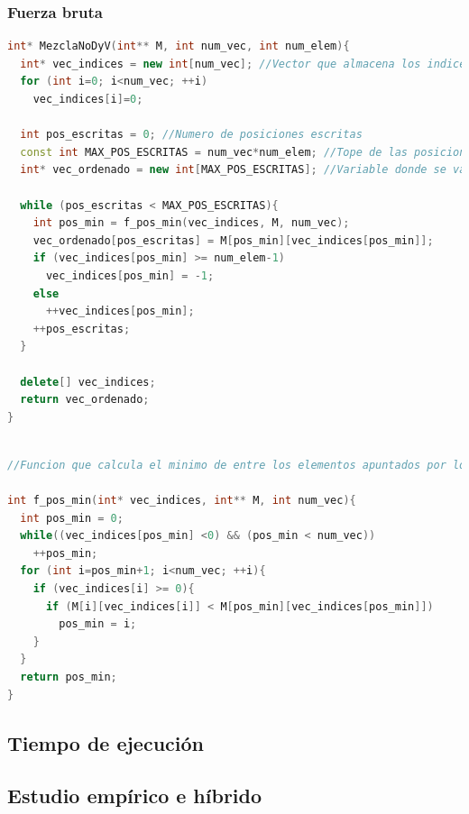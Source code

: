 \subsubsection{Fuerza bruta}

\begin{lstlisting}[language=c++]
int* MezclaNoDyV(int** M, int num_vec, int num_elem){
  int* vec_indices = new int[num_vec]; //Vector que almacena los indices
  for (int i=0; i<num_vec; ++i)
    vec_indices[i]=0;

  int pos_escritas = 0; //Numero de posiciones escritas
  const int MAX_POS_ESCRITAS = num_vec*num_elem; //Tope de las posiciones que se pueden escribir (n*k)
  int* vec_ordenado = new int[MAX_POS_ESCRITAS]; //Variable donde se va almacenando el vector resultante ordenado.

  while (pos_escritas < MAX_POS_ESCRITAS){
    int pos_min = f_pos_min(vec_indices, M, num_vec);
    vec_ordenado[pos_escritas] = M[pos_min][vec_indices[pos_min]];
    if (vec_indices[pos_min] >= num_elem-1)
      vec_indices[pos_min] = -1;
    else
      ++vec_indices[pos_min];
    ++pos_escritas;
  }

  delete[] vec_indices;
  return vec_ordenado;
}
\end{lstlisting}

\begin{lstlisting}[language=c++]

//Funcion que calcula el minimo de entre los elementos apuntados por los indices

int f_pos_min(int* vec_indices, int** M, int num_vec){
  int pos_min = 0;
  while((vec_indices[pos_min] <0) && (pos_min < num_vec))
    ++pos_min;
  for (int i=pos_min+1; i<num_vec; ++i){
    if (vec_indices[i] >= 0){
      if (M[i][vec_indices[i]] < M[pos_min][vec_indices[pos_min]])
        pos_min = i;
    }
  }
  return pos_min;
}
\end{lstlisting}

\subsection{Tiempo de ejecuci\'on}


\subsection{Estudio emp\'irico e h\'ibrido}

